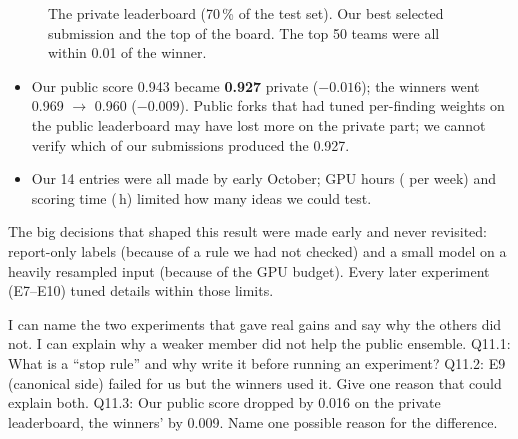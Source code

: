 \begin{figure}[H]
\centering
{}
\caption{The private leaderboard (70\,\% of the test set). Our best selected submission and the top of the board.
The top 50 teams were all within 0.01 of the winner.}
\label{fig:finalLB}
\end{figure}

\begin{innumbers}
\begin{itemize}
\item Our public score 0.943 became \textbf{0.927} private ($-0.016$); the winners went 0.969 $\rightarrow$ 0.960
      ($-0.009$). Public forks that had tuned per-finding weights on the public leaderboard may have lost more on the
      private part; we cannot verify which of our submissions produced the 0.927.
\item Our 14 entries were all made by early October; GPU hours ( per week) and scoring time (\,h) limited
      how many ideas we could test.
\end{itemize}
\end{innumbers}

\begin{watchout}
The big decisions that shaped this result were made early and never revisited: report-only labels (because of a rule
we had not checked) and a small model on a heavily resampled input (because of the GPU budget). Every later
experiment (E7--E10) tuned details within those limits.
\end{watchout}

\begin{checkpoint}
\begin{itemize}
\done I can name the two experiments that gave real gains and say why the others did not.
\done I can explain why a weaker member did not help the public ensemble.
\quiz Q11.1: What is a ``stop rule'' and why write it before running an experiment?
\quiz Q11.2: E9 (canonical side) failed for us but the winners used it. Give one reason that could explain both.
\quiz Q11.3: Our public score dropped by 0.016 on the private leaderboard, the winners' by 0.009. Name one possible
      reason for the difference.
\end{itemize}
\end{checkpoint}
